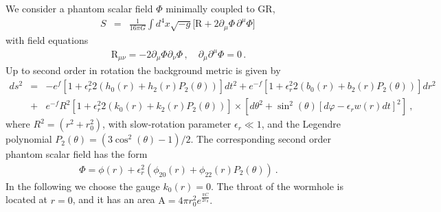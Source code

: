 \documentclass{article}
\begin{document}
We consider a phantom scalar field $\Phi$ minimally coupled to GR,
\begin{eqnarray}
			S &=& \frac{1}{16 \pi G}\int d^4x \sqrt{-g} 
		\Big[\mathrm{R} + 2 \partial_\mu \Phi \, \partial^\mu \Phi 
		 \Big] \, 
   \label{eq:ellis} 
\end{eqnarray}
with field equations %
\begin{eqnarray}
    \mathrm{R}_{\mu\nu} = -2 \partial_{\mu}\Phi\partial_{\nu}\Phi \, , \quad 
    \partial_{\mu}\partial^{\mu}\Phi = 0 \, .
\end{eqnarray}
%
Up to second order in rotation the background metric is given by
\begin{eqnarray}
ds^2 &=& -e^{f}\left[1+\epsilon_r^2 2\left(h_0(r)+h_2(r)P_2(\theta)\right)\right]dt^2 
+ e^{-f}\left[1+\epsilon_r^2 2\left(b_0(r)+b_2(r)P_2(\theta)\right)\right]dr^2 \nonumber \\ 
&+& 
%
{e^{-f}} R^2
\left[1+\epsilon_r^2 2\left(k_0(r)+k_2(r)P_2(\theta)\right)\right]
\times 
\left[
d\theta^2+\sin^2{(\theta)}\left[d\varphi-\epsilon_rw(r)dt\right]^2 
\right]
\ ,
\label{metric_1}
\end{eqnarray}
where $R^2=(r^2+r_0^2)$, with slow-rotation parameter $\epsilon_r \ll 1$, and the Legendre polynomial $P_2(\theta) = \left(3\cos^2{(\theta)}-1\right)/2$.
%
%
%
The corresponding second order phantom scalar field has the form
\begin{eqnarray}
\Phi = \phi(r) + \epsilon_r^2 \left(\phi_{20}(r)+\phi_{22}(r)P_2(\theta)\right) \ .
\label{scalar_1}
\end{eqnarray}
%
In the following we choose the gauge $k_0(r)=0$.
%
The throat of the wormhole is located at $r=0$, and it has an area {$\mathrm{A}=4\pi r_0^2 e^{\frac{\pi C}{2r_0}}$.}
%
%
\end{document}
